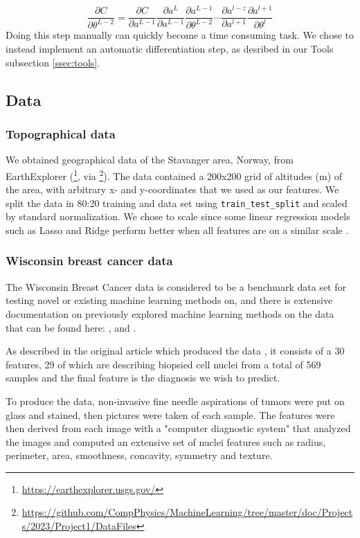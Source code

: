 \[
\frac{\partial C}{\partial \theta^{L-2}} = \frac{\partial C}{\partial a^{L-1}} \frac{\partial a^L}{\partial a^{L-1}} \frac{\partial a^{L-1}}{\partial \theta^{L-2}} \cdots \frac{\partial a^{l-z}}{\partial a^{l+1}} \frac{\partial a^{l+1}}{\partial \theta^l}
\]
%
Doing this step manually can quickly become a time consuming task. We chose to instead implement an automatic 
differentiation step, as desribed in our Tools subsection \ref{ssec:tools}.



\subsection{Data}\label{ssec:data}
%
\subsubsection*{Topographical data}
We obtained geographical data of the Stavanger area, Norway, from EarthExplorer (\footnote{\url{https://earthexplorer.usgs.gov/}}, via \footnote{\url{https://github.com/CompPhysics/MachineLearning/tree/master/doc/Projects/2023/Project1/DataFiles}}). 
The data contained a 200x200 grid of altitudes (m) of the area, with arbitrary x- and y-coordinates that we used as our features. 
We split the data in 80:20 training 
and data set using \texttt{train\_test\_split} and scaled by standard normalization. We chose to scale since some linear regression 
models such as Lasso and Ridge perform better when all features are on a similar scale \cite{raschka2019}. 
\\
\subsubsection*{Wisconsin breast cancer data}
The Wisconsin Breast Cancer data \cite{bc_wisconsin} is considered to be a benchmark data set for testing novel or existing machine learning methods on, and there is extensive documentation on previously explored machine learning methods on the data that can be found here: 
\cite{wisconsin_example1}, \cite{wisconsin_example2} and \cite{wisconsin_example3}.

As described in the original article which produced the data \cite{first_wisconsin}, it consists of a 30 features, 29 of which are describing biopsied cell nuclei from 
a total of 569 samples and the final feature is the diagnosis we wish to predict. 

To produce the data, non-invasive fine needle aspirations of tumors were put on glass and stained, then pictures were taken of each sample. The features were then derived from each image with a "computer diagnostic system" that 
analyzed the images and computed an extensive set of nuclei features such as radius, perimeter, area, smoothness, concavity, symmetry and texture. 

